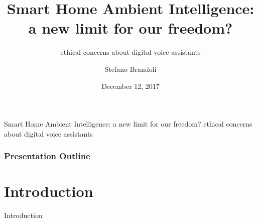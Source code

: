 \documentclass{beamer}
\title{Smart Home Ambient Intelligence: \\a new limit for our freedom?}
\subtitle{\vspace*{0.3cm}ethical concerns about digital voice assistants}
\author[Stefano Brandoli]{Stefano Brandoli}
\institute[PoliMi]{Politecnico di Milano}
\date{December 12, 2017}
\begin{document}
\begin{frame}
\maketitle
\end{frame}

\begin{frame}
\begin{center}{\vspace*{-0.5cm}Smart Home Ambient Intelligence: a new limit for our freedom?
ethical concerns about digital voice assistants}
\end{center}
\frametitle{Presentation Outline}

\tableofcontents[hideallsubsections]
\end{frame}

\section{Introduction}
\begin{frame}
\begin{center}
	 Introduction
\end{center}
\end{frame}
\end{document}
